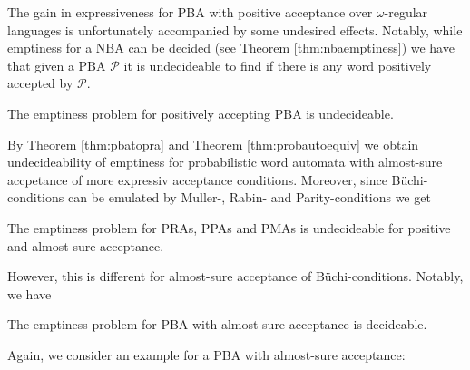 The gain in expressiveness for \ac{PBA} with positive acceptance over 
$\omega$-regular languages is unfortunately accompanied by some undesired 
effects. Notably, while emptiness for a \ac{NBA} can be decided (see Theorem 
\ref{thm:nbaemptiness}) we have that given a \ac{PBA} $\mathcal{P}$ it is 
undecideable to find if there is any word positively accepted by $\mathcal{P}$.
\begin{theorem}
  \cite[Theorem 2]{DecProblemsForProbAuto}
  The emptiness problem for positively accepting \ac{PBA} is undecideable.
  \label{thm:emptinesspospba}
\end{theorem}
By Theorem \ref{thm:pbatopra} and Theorem \ref{thm:probautoequiv} we obtain
undecideability of emptiness for probabilistic word automata with 
almost-sure accpetance of more expressiv acceptance conditions. Moreover, since 
Büchi-conditions can be emulated by Muller-, Rabin- and Parity-conditions we
get
\begin{corollary}
  The emptiness problem for \acp{PRA}, \acp{PPA} and \acp{PMA} is undecideable
  for positive and almost-sure acceptance.
  \label{cor:emptinessstrongalmostsureprob}
\end{corollary}
However, this is different for almost-sure acceptance of Büchi-conditions.
Notably, we have
\begin{theorem}
  \cite[Theorem 6]{DecProblemsForProbAuto}
  The emptiness problem for \ac{PBA} with almost-sure acceptance is decideable.
  \label{thm:emptinessalmostsurepba}
\end{theorem}
Again, we consider an example for a \ac{PBA} with almost-sure acceptance:
